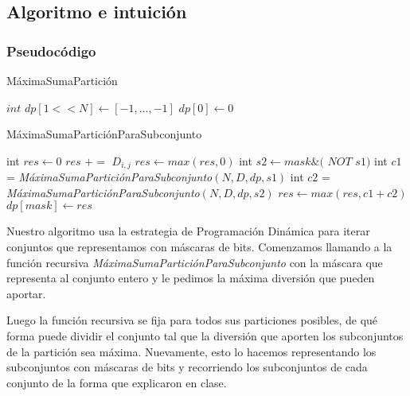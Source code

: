 \subsection{Algoritmo e intuición}

\subsubsection{Pseudocódigo}

\begin{algorithm}[H]
    \caption{MáximaSumaPartición}
    $int$  $\mathit{dp[1<<N]} \gets [-1,...,-1]$ \;
    $\mathit{dp[0]} \gets 0$ \;
\end{algorithm}

\begin{algorithm}[H]
    \caption{MáximaSumaParticiónParaSubconjunto}
     {
    }{
    int $\mathit{res} \gets 0$ \;
     {
         {
             {
                $res$ $+=$ $D_{i,j}$
            }
        }
    }
    $res \gets max(res, 0)$ \;
     {
        int $s2 \gets mask \& ($ $NOT$ $ s1)$ \;
        int $c1$ = \emph{MáximaSumaParticiónParaSubconjunto}$(N, D, dp, s1)$ \;
        int $c2$ = \emph{MáximaSumaParticiónParaSubconjunto}$(N, D, dp, s2)$ \;
        $res \gets max(res, c1+c2)$ \;
    }
    $dp[mask] \gets res$ \;
    }
\end{algorithm}
\bigskip

Nuestro algoritmo usa la estrategia de Programación Dinámica para iterar
conjuntos que representamos con máscaras de bits. Comenzamos llamando a la
función recursiva \emph{MáximaSumaParticiónParaSubconjunto} con la máscara que
representa al conjunto entero y le pedimos la máxima diversión que pueden
aportar.

Luego la función recursiva se fija para todos sus particiones
posibles, de qué forma puede dividir el conjunto tal que la diversión que
aporten los subconjuntos de la partición sea máxima. Nuevamente, esto lo hacemos
representando los subconjuntos con máscaras de bits y recorriendo los
subconjuntos de cada conjunto de la forma que explicaron en clase.

